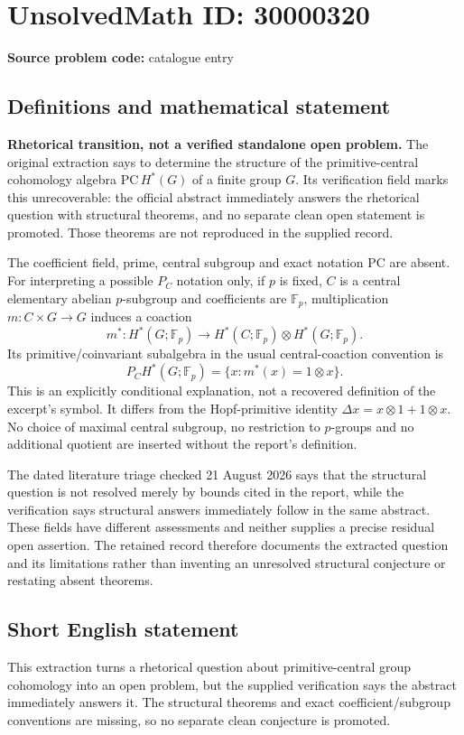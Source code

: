 \documentclass[11pt]{article}
\newcommand{\F}{\mathbb{F}}
\begin{document}
\section*{UnsolvedMath ID: 30000320}
\textbf{Source problem code:} catalogue entry
\subsection{Definitions and mathematical statement}
\textbf{Rhetorical transition, not a verified standalone open problem.} The original extraction says to determine the structure of the primitive-central cohomology algebra $\mathrm{PC}\,H^*(G)$ of a finite group $G$. Its verification field marks this unrecoverable: the official abstract immediately answers the rhetorical question with structural theorems, and no separate clean open statement is promoted. Those theorems are not reproduced in the supplied record.

The coefficient field, prime, central subgroup and exact notation $\mathrm{PC}$ are absent. For interpreting a possible $P_C$ notation only, if $p$ is fixed, $C$ is a central elementary abelian $p$-subgroup and coefficients are $\F_p$, multiplication $m:C\times G\to G$ induces a coaction
\[
 m^*:H^*(G;\F_p)\longrightarrow H^*(C;\F_p)\otimes H^*(G;\F_p).
\]
Its primitive/coinvariant subalgebra in the usual central-coaction convention is
\[
 P_C H^*(G;\F_p)=\{x:m^*(x)=1\otimes x\}.
\]
This is an explicitly conditional explanation, not a recovered definition of the excerpt's symbol. It differs from the Hopf-primitive identity $\Delta x=x\otimes1+1\otimes x$. No choice of maximal central subgroup, no restriction to $p$-groups and no additional quotient are inserted without the report's definition.

The dated literature triage checked 21 August 2026 says that the structural question is not resolved merely by bounds cited in the report, while the verification says structural answers immediately follow in the same abstract. These fields have different assessments and neither supplies a precise residual open assertion. The retained record therefore documents the extracted question and its limitations rather than inventing an unresolved structural conjecture or restating absent theorems.
\subsection{Short English statement}
This extraction turns a rhetorical question about primitive-central group cohomology into an open problem, but the supplied verification says the abstract immediately answers it. The structural theorems and exact coefficient/subgroup conventions are missing, so no separate clean conjecture is promoted.
\end{document}
